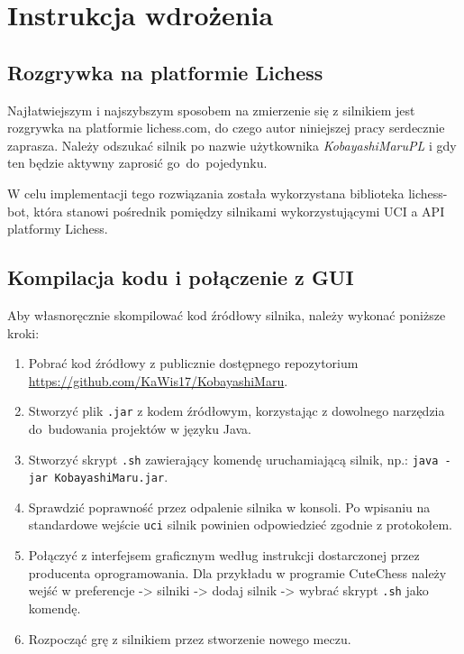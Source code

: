 \chapter{Instrukcja wdrożenia}
\label{ch:instrukcja-wdrozenia}

\section{Rozgrywka na platformie Lichess}
\label{sec:rozgrywka-na-platformie-lichess}
Najłatwiejszym i najszybszym sposobem na zmierzenie się z silnikiem jest rozgrywka na platformie lichess.com, do czego autor niniejszej pracy serdecznie zaprasza.
Należy odszukać silnik po nazwie użytkownika \textit{KobayashiMaruPL} i gdy ten będzie aktywny zaprosić go~do~pojedynku.

W celu implementacji tego rozwiązania została wykorzystana biblioteka lichess-bot, która stanowi pośrednik pomiędzy silnikami wykorzystującymi UCI a API platformy Lichess. \cite{lichess-bot}

\section{Kompilacja kodu i połączenie z GUI}
\label{sec:kompilacja-kodu-i-polaczenie-z-gui}

Aby własnoręcznie skompilować kod źródłowy silnika, należy wykonać poniższe kroki:
\begin{enumerate}
    \item Pobrać kod źródłowy z publicznie dostępnego repozytorium \url{https://github.com/KaWis17/KobayashiMaru}.
    \item Stworzyć plik \texttt{.jar} z kodem źródłowym, korzystając z dowolnego narzędzia do~budowania projektów w języku Java.
    \item Stworzyć skrypt \texttt{.sh} zawierający komendę uruchamiającą silnik, np.: \texttt{java~-jar~KobayashiMaru.jar}.
    \item Sprawdzić poprawność przez odpalenie silnika w konsoli.
    Po wpisaniu na standardowe wejście \texttt{uci} silnik powinien odpowiedzieć zgodnie z protokołem.
    \item Połączyć z interfejsem graficznym według instrukcji dostarczonej przez producenta oprogramowania.
    Dla przykładu w programie CuteChess należy wejść w preferencje -> silniki -> dodaj silnik -> wybrać skrypt \texttt{.sh} jako komendę.
    \item Rozpocząć grę z silnikiem przez stworzenie nowego meczu.
\end{enumerate}

